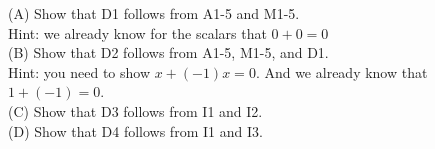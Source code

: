 \documentclass[12pt]{article}
\begin{document}
\noindent
(A) Show that D1 follows from A1-5 and M1-5.\\  

Hint:  we already know for the scalars that $0+0=0$\\[5pt]

\noindent
(B) Show that D2 follows from A1-5, M1-5, and D1.\\

Hint: you need to show $x + (-1)x = 0$.  And we already know that $1+(-1)=0$.\\[5pt]

\noindent
(C) Show that D3 follows from I1 and I2.\\[5pt] 

\noindent
(D) Show that D4 follows from I1 and I3.\\[5pt]


\newpage
\end{document}
